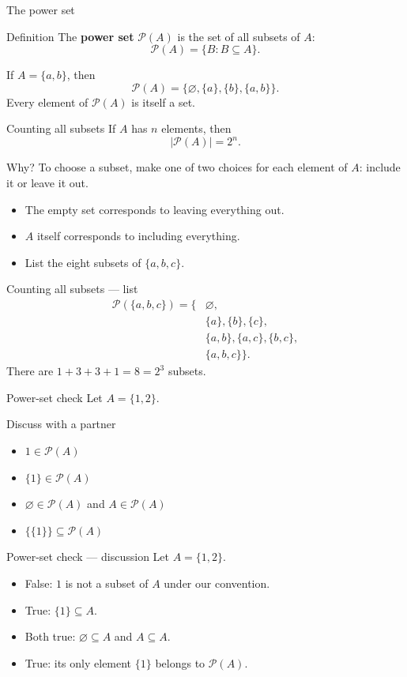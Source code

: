 \documentclass{beamer}
\newcommand{\pow}{\mathcal{P}}
\begin{document}
\begin{frame}{The power set}
\begin{block}{Definition}
The \textbf{power set} $\pow(A)$ is the set of all subsets of $A$:\[\pow(A)=\{B:B\subseteq A\}.\]
\end{block}If $A=\{a,b\}$, then\[\pow(A)=\{\varnothing,\{a\},\{b\},\{a,b\}\}.\]\medskip Every element of $\pow(A)$ is itself a set.
\end{frame}
\begin{frame}{Counting all subsets}
If $A$ has $n$ elements, then\[|\pow(A)|=2^n.\]\begin{block}{Why?}
To choose a subset, make one of two choices for each element of $A$: include it or leave it out.
\end{block}\begin{itemize}
\item The empty set corresponds to leaving everything out.
\item $A$ itself corresponds to including everything.
\item List the eight subsets of $\{a,b,c\}$.
\end{itemize}
\end{frame}
\begin{frame}{Counting all subsets --- list}
\[\begin{aligned}\pow(\{a,b,c\})=\{&\varnothing,\\&\{a\},\{b\},\{c\},\\&\{a,b\},\{a,c\},\{b,c\},\\&\{a,b,c\}\}.\end{aligned}\]\medskip There are $1+3+3+1=8=2^3$ subsets.
\end{frame}
\begin{frame}{Power-set check}
Let $A=\{1,2\}$.
\begin{block}{Discuss with a partner}
\begin{itemize}
\item $1\in\pow(A)$
\item $\{1\}\in\pow(A)$
\item $\varnothing\in\pow(A)$ and $A\in\pow(A)$
\item $\{\{1\}\}\subseteq\pow(A)$
\end{itemize}
\end{block}
\end{frame}
\begin{frame}{Power-set check --- discussion}
Let $A=\{1,2\}$.
\begin{itemize}
\item False: $1$ is not a subset of $A$ under our convention.
\item True: $\{1\}\subseteq A$.
\item Both true: $\varnothing\subseteq A$ and $A\subseteq A$.
\item True: its only element $\{1\}$ belongs to $\pow(A)$.
\end{itemize}
\end{frame}
\end{document}
